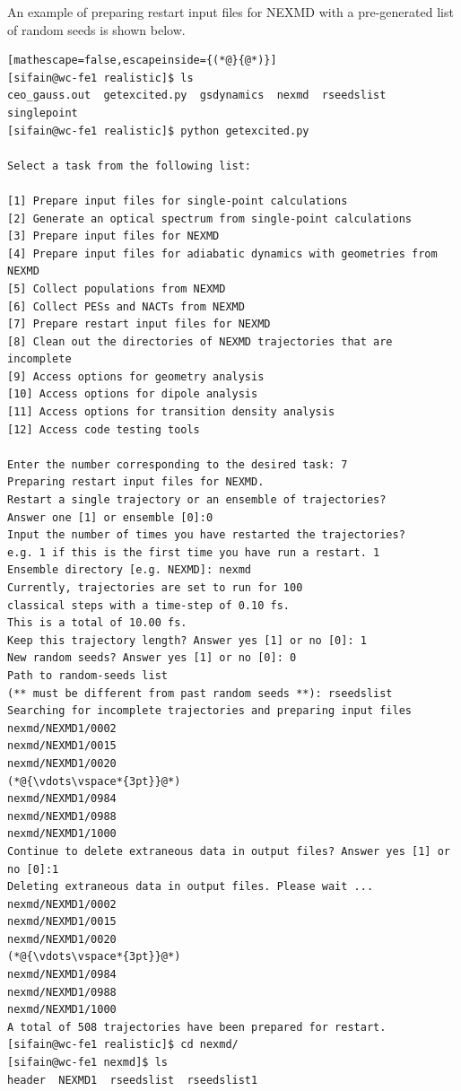 \documentclass[letterpaper,12pt,titlepage]{article}
\begin{document}
An example of preparing restart input files for NEXMD with a pre-generated list of random seeds is shown below.
\begin{lstlisting}[mathescape=false,escapeinside={(*@}{@*)}]
[sifain@wc-fe1 realistic]$ ls
ceo_gauss.out  getexcited.py  gsdynamics  nexmd  rseedslist  singlepoint
[sifain@wc-fe1 realistic]$ python getexcited.py 

Select a task from the following list:

[1] Prepare input files for single-point calculations
[2] Generate an optical spectrum from single-point calculations
[3] Prepare input files for NEXMD
[4] Prepare input files for adiabatic dynamics with geometries from NEXMD
[5] Collect populations from NEXMD
[6] Collect PESs and NACTs from NEXMD
[7] Prepare restart input files for NEXMD
[8] Clean out the directories of NEXMD trajectories that are incomplete
[9] Access options for geometry analysis
[10] Access options for dipole analysis
[11] Access options for transition density analysis
[12] Access code testing tools

Enter the number corresponding to the desired task: 7
Preparing restart input files for NEXMD.
Restart a single trajectory or an ensemble of trajectories?
Answer one [1] or ensemble [0]:0
Input the number of times you have restarted the trajectories?
e.g. 1 if this is the first time you have run a restart. 1
Ensemble directory [e.g. NEXMD]: nexmd 
Currently, trajectories are set to run for 100 
classical steps with a time-step of 0.10 fs.
This is a total of 10.00 fs.
Keep this trajectory length? Answer yes [1] or no [0]: 1
New random seeds? Answer yes [1] or no [0]: 0
Path to random-seeds list
(** must be different from past random seeds **): rseedslist
Searching for incomplete trajectories and preparing input files 
nexmd/NEXMD1/0002
nexmd/NEXMD1/0015
nexmd/NEXMD1/0020
(*@{\vdots\vspace*{3pt}}@*)
nexmd/NEXMD1/0984
nexmd/NEXMD1/0988
nexmd/NEXMD1/1000
Continue to delete extraneous data in output files? Answer yes [1] or no [0]:1
Deleting extraneous data in output files. Please wait ...
nexmd/NEXMD1/0002
nexmd/NEXMD1/0015
nexmd/NEXMD1/0020
(*@{\vdots\vspace*{3pt}}@*)
nexmd/NEXMD1/0984
nexmd/NEXMD1/0988
nexmd/NEXMD1/1000
A total of 508 trajectories have been prepared for restart.
[sifain@wc-fe1 realistic]$ cd nexmd/
[sifain@wc-fe1 nexmd]$ ls
header  NEXMD1  rseedslist  rseedslist1
\end{lstlisting}
\end{document}
